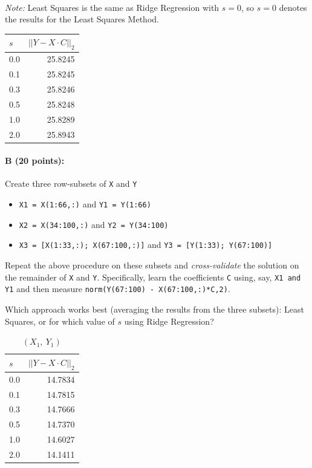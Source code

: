 \documentclass[11pt]{article}
\begin{document}
\ \newline
\ \newline

{\em Note:} Least Squares is the same as Ridge Regression with $s = 0$, so $s=0$ denotes the results for the Least Squares Method.

\begin{table}[H]
\centering
\begin{tabular}{@{}l r@{}}
\hline\hline
$s$ & $\left|\left| Y - X\cdot C\right|\right|_{2}$\\
\hline
0.0 & 25.8245 \\
0.1 & 25.8245 \\
0.3 & 25.8246 \\
0.5 & 25.8248 \\
1.0 & 25.8289 \\
2.0 & 25.8943 \\
\hline
\end{tabular}
\end{table}


\paragraph{B (20 points): }
Create three row-subsets of \texttt{X} and \texttt{Y}
\begin{itemize} \denselist
\item \texttt{X1 = X(1:66,:)} and \texttt{Y1 = Y(1:66)}
\item \texttt{X2 = X(34:100,:)} and \texttt{Y2 = Y(34:100)}
\item \texttt{X3 = [X(1:33,:); X(67:100,:)]} and \texttt{Y3 = [Y(1:33); Y(67:100)]}
\end{itemize}

Repeat the above procedure on these subsets and \emph{cross-validate} the solution on the remainder of \texttt{X} and \texttt{Y}.  Specifically, learn the coefficients \texttt{C} using, say, \texttt{X1 and Y1} and then measure \texttt{norm(Y(67:100) - X(67:100,:)*C,2)}.  

Which approach works best (averaging the results from the three subsets): Least Squares, or for which value of $s$ using Ridge Regression?  

\begin{table}[H]
\centering
\caption{$(X_{1},\ Y_{1})$}
\begin{tabular}{@{}l r@{}}
\hline\hline
$s$ & $\left|\left| Y - X\cdot C\right|\right|_{2}$\\
\hline
0.0 & 14.7834 \\
0.1 & 14.7815 \\
0.3 & 14.7666 \\
0.5 & 14.7370 \\
1.0 & 14.6027 \\
2.0 & 14.1411 \\
\hline
\end{tabular}
\end{table}
\end{document}
